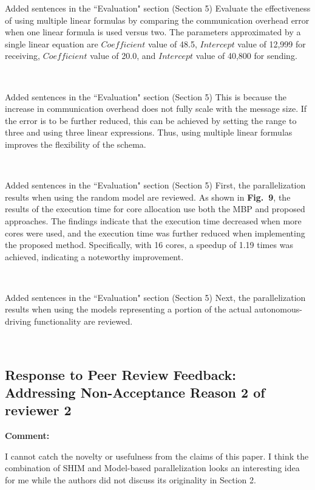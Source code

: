 \documentclass{article}
\begin{document}
\begin{itembox}[|]{Added sentences in the ``Evaluation" section (Section 5)}
    Evaluate the effectiveness of using multiple linear formulas by comparing the communication overhead error when one linear formula is used versus two.
    The parameters approximated by a single linear equation are $Coefficient$ value of 48.5, $Intercept$ value of 12,999 for receiving, $Coefficient$ value of 20.0, and $Intercept$ value of 40,800 for sending.
\end{itembox}\\

\begin{itembox}[|]{Added sentences in the ``Evaluation" section (Section 5)}
    This is because the increase in communication overhead does not fully scale with the message size.
    If the error is to be further reduced, this can be achieved by setting the range to three and using three linear expressions.
    Thus, using multiple linear formulas improves the ﬂexibility of the schema.
\end{itembox}\\

\begin{itembox}[|]{Added sentences in the ``Evaluation" section (Section 5)}
    First, the parallelization results when using the random model are reviewed. 
    As shown in \textbf{Fig.~9}, the results of the execution time for core allocation use both the MBP and proposed approaches. The findings indicate that the execution time decreased when more cores were used, and the execution time was further reduced when implementing the proposed method. Specifically, with 16 cores, a speedup of 1.19 times was achieved, indicating a noteworthy improvement.
\end{itembox}\\

\begin{itembox}[|]{Added sentences in the ``Evaluation" section (Section 5)}
    Next, the parallelization results when using the models representing a portion of the actual autonomous-driving functionality are reviewed.
\end{itembox}\\


\subsection{Response to Peer Review Feedback: Addressing Non-Acceptance Reason 2 of reviewer 2}
\begin{flushleft}
  \textbf{Comment:}

\end{flushleft}
\begin{adjustwidth}{1cm}{1cm}  %
    I cannot catch the novelty or usefulness from the claims of this paper.  I think the combination of SHIM and Model-based parallelization looks an interesting idea for me while the authors did not discuss its originality in Section 2. 
\end{adjustwidth}
    
\end{document}
